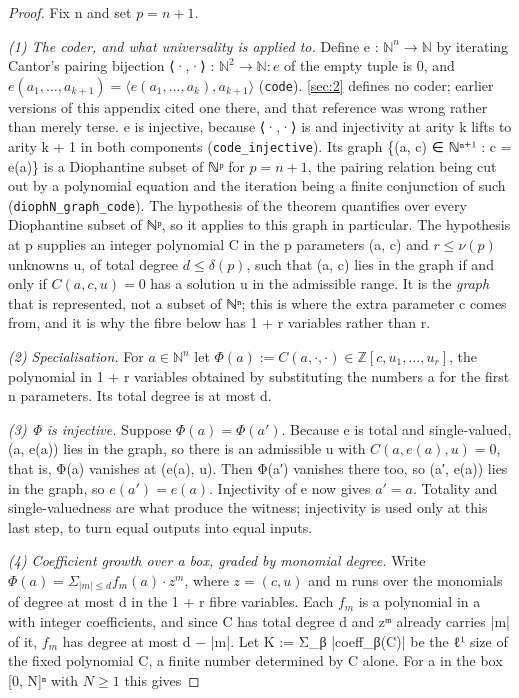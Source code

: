 \documentclass[11pt]{article}
\theoremstyle{plain}
\theoremstyle{definition}
\theoremstyle{remark}
\theoremstyle{plain}
\theoremstyle{definition}
\theoremstyle{remark}
\theoremstyle{plain}
\theoremstyle{definition}
\theoremstyle{remark}
\begin{document}
\begin{proof}
Fix n and set $p = n + 1$.

\emph{(1) The coder, and what universality is applied to.} Define e : $ℕ^{n} → ℕ$ by iterating Cantor's pairing bijection ⟨·,·⟩ : $ℕ^{2} → ℕ: e$ of the empty tuple is 0, and $e(a_{1}, …, a_{k+1}) = ⟨e(a_{1}, …, a_{k}), a_{k+1}⟩$ (\texttt{code}). \cref{sec:2} defines no coder; earlier versions of this appendix cited one there, and that reference was wrong rather than merely terse. e is injective, because ⟨·,·⟩ is and injectivity at arity k lifts to arity k + 1 in both components (\texttt{code\_\allowbreak{}injective}). Its graph \{(a, c) ∈ ℕⁿ⁺¹ : c = e(a)\} is a Diophantine subset of ℕᵖ for $p = n + 1$, the pairing relation being cut out by a polynomial equation and the iteration being a finite conjunction of such (\texttt{diophN\_\allowbreak{}graph\_\allowbreak{}code}). The hypothesis of the theorem quantifies over every Diophantine subset of ℕᵖ, so it applies to this graph in particular. The hypothesis at p supplies an integer polynomial C in the p parameters (a, c) and $r ≤ ν(p)$ unknowns u, of total degree $d ≤ δ(p)$, such that (a, c) lies in the graph if and only if $C(a, c, u) = 0$ has a solution u in the admissible range. It is the \emph{graph} that is represented, not a subset of ℕⁿ; this is where the extra parameter c comes from, and it is why the fibre below has 1 + r variables rather than r.

\emph{(2) Specialisation.} For $a ∈ ℕ^{n}$ let $Φ(a) := C(a, ·, ·) ∈ ℤ[c, u_{1}, …, u_{r}]$, the polynomial in 1 + r variables obtained by substituting the numbers a for the first n parameters. Its total degree is at most d.

\emph{(3) Φ is injective.} Suppose $Φ(a) = Φ(a′)$. Because e is total and single-valued, (a, e(a)) lies in the graph, so there is an admissible u with $C(a, e(a), u) = 0$, that is, Φ(a) vanishes at (e(a), u). Then Φ(a′) vanishes there too, so (a′, e(a)) lies in the graph, so $e(a′) = e(a)$. Injectivity of e now gives $a′ = a$. Totality and single-valuedness are what produce the witness; injectivity is used only at this last step, to turn equal outputs into equal inputs.

\emph{(4) Coefficient growth over a box, graded by monomial degree.} Write $Φ(a) = Σ_{|m| ≤ d} f_{m}(a) · z^{m}$, where $z = (c, u)$ and m runs over the monomials of degree at most d in the 1 + r fibre variables. Each $f_{m}$ is a polynomial in a with integer coefficients, and since C has total degree d and zᵐ already carries |m| of it, $f_{m}$ has degree at most d − |m|. Let K := Σ\_β |coeff\_β(C)| be the ℓ¹ size of the fixed polynomial C, a finite number determined by C alone. For a in the box [0, N]ⁿ with $N ≥ 1$ this gives


\end{proof}
\end{document}
